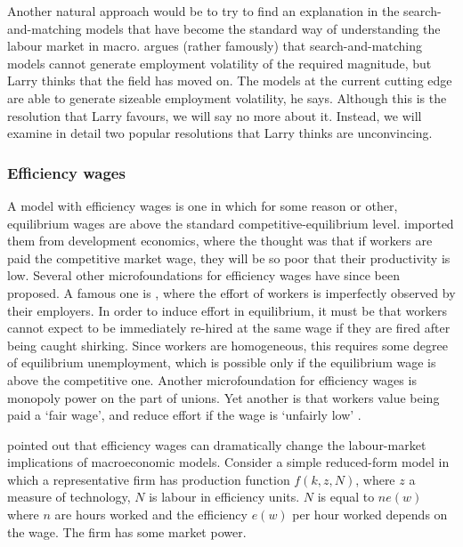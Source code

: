 \documentclass[11pt,letterpaper,reqno,oneside]{article}
\begin{document}
Another natural approach would be to try to find an explanation in the search-and-matching models that have become the standard way of understanding the labour market in macro. \textcite{Shimer2005} argues (rather famously) that search-and-matching models cannot generate employment volatility of the required magnitude, but Larry thinks that the field has moved on. The models at the current cutting edge are able to generate sizeable employment volatility, he says. Although this is the resolution that Larry favours, we will say no more about it. Instead, we will examine in detail two popular resolutions that Larry thinks are unconvincing.



\subsubsection{Efficiency wages}
\label{sec:23Nov2015:resolving_emp_vol_puzzle:efficiency_wages}

A model with efficiency wages is one in which for some reason or other, equilibrium wages are above the standard competitive-equilibrium level. \textcite{Solow1979} imported them from development economics, where the thought was that if workers are paid the competitive market wage, they will be so poor that their productivity is low. Several other microfoundations for efficiency wages have since been proposed. A famous one is \textcite{ShapiroStiglitz1984}, where the effort of workers is imperfectly observed by their employers. In order to induce effort in equilibrium, it must be that workers cannot expect to be immediately re-hired at the same wage if they are fired after being caught shirking. Since workers are homogeneous, this requires some degree of equilibrium unemployment, which is possible only if the equilibrium wage is above the competitive one. Another microfoundation for efficiency wages is monopoly power on the part of unions. Yet another is that workers value being paid a `fair wage', and reduce effort if the wage is `unfairly low' \parencite{Akerlof1982}.


\textcite{Solow1979} pointed out that efficiency wages can dramatically change the labour-market implications of macroeconomic models. Consider a simple reduced-form model in which a representative firm has production function $f(k,z,N)$, where $z$ a measure of technology, $N$ is labour in efficiency units. $N$ is equal to $n e(w)$ where $n$ are hours worked and the efficiency $e(w)$ per hour worked depends on the wage. The firm has some market power.
\end{document}
